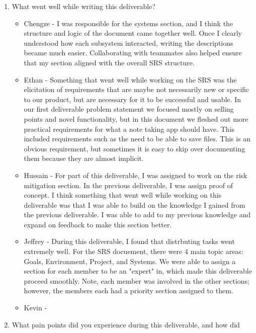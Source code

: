 \begin{enumerate}
  \item What went well while writing this deliverable?
  \begin{itemize}
        \item Chengze - I was responsible for the systems section, and 
        I think the structure and logic of the document came together 
        well. Once I clearly understood how each subsystem interacted, 
        writing the descriptions became much easier. Collaborating with 
        teammates also helped ensure that my section aligned with the 
        overall SRS structure.
        \item Ethan - Something that went well while working on the SRS was the
          elicitation of requirements that are maybe not necessarily new or
          specific to our product, but are necessary for it to be successful
          and usable. In our first deliverable problem statement we focused
          mostly on selling points and novel functionality, but in this
          document we fleshed out more practical requirements for what a note
          taking app should have. This included requirements such as the need
          to be able to save files. This is an obvious requirement, but
          sometimes it is easy to skip over documenting them because they are
          almost implicit.
        \item Hussain - For part of this deliverable, I was assigned to work on
         the risk mitigation section. In the previous deliverable, I was assign
         proof of concept. I think something that went well while working on
         this deliverable was that I was able to build on the knowledge I
         gained from the previous deliverable. I was able to add to my previous
         knowledge and expand on feedback to make this section better.
        \item Jeffrey - During this deliverable, I found that distrbuting tasks
        went extremely well. For the SRS docuement, there were 4 main topic areas:
        Goals, Environment, Project, and Systems. We were able to assign a 
        section for each member to be an "expert" in, which made this 
        deliverable proceed smoothly. Note, each member was involved in the 
        other sections; however, the members each had a priority section assigned 
        to them. 
        \item Kevin - 
  \end{itemize} 
  \item What pain points did you experience during this deliverable, and how did

\end{enumerate}
